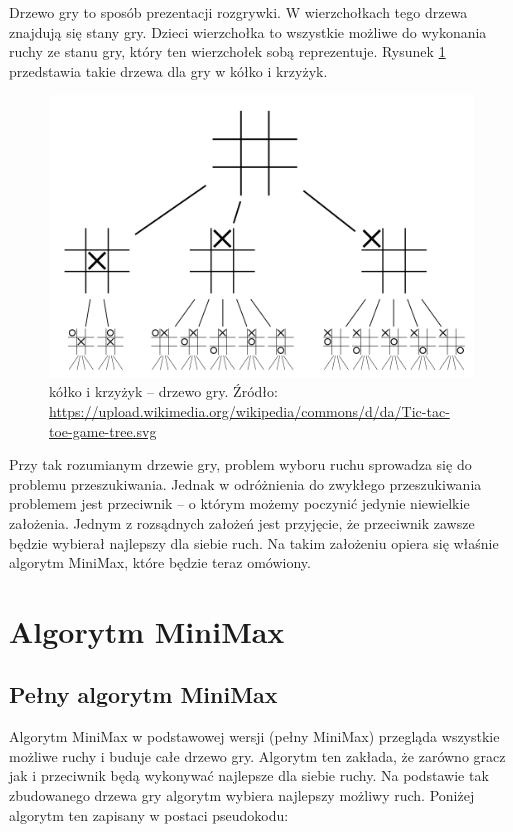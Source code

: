 \documentclass[polish,shortabstract,inz]{iithesis}
\begin{document}
Drzewo gry to sposób prezentacji rozgrywki.
W wierzchołkach tego drzewa znajdują się stany gry.
Dzieci wierzchołka to wszystkie możliwe do wykonania ruchy ze stanu gry, który ten wierzchołek sobą reprezentuje.
Rysunek \ref{fig:oxTree} przedstawia takie drzewa dla gry w kółko i krzyżyk.


\begin{figure}[H]
  \includegraphics[scale=0.3]{./images/tictactoetree.png}
  \centering
  \caption{kółko i krzyżyk -- drzewo gry. \newline Źródło:\,\url{https://upload.wikimedia.org/wikipedia/commons/d/da/Tic-tac-toe-game-tree.svg}}
  \label{fig:oxTree}
\end{figure}

Przy tak rozumianym drzewie gry, problem wyboru ruchu sprowadza się do problemu przeszukiwania.
Jednak w odróżnienia do zwykłego przeszukiwania problemem jest przeciwnik -- o którym możemy poczynić jedynie niewielkie założenia.
Jednym z rozsądnych założeń jest przyjęcie, że przeciwnik zawsze będzie wybierał najlepszy dla siebie ruch.
Na takim założeniu opiera się właśnie algorytm MiniMax, które będzie teraz omówiony.


\section{Algorytm MiniMax}
\subsection{Pełny algorytm MiniMax}
Algorytm MiniMax w podstawowej wersji (pełny MiniMax) przegląda wszystkie możliwe ruchy i buduje całe drzewo gry.
Algorytm ten zakłada, że zarówno gracz jak i przeciwnik będą wykonywać najlepsze dla siebie ruchy.
Na podstawie tak zbudowanego drzewa gry algorytm wybiera najlepszy możliwy ruch.
Poniżej algorytm ten zapisany w postaci pseudokodu:
\end{document}
